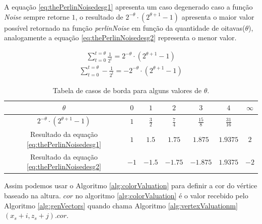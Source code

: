 A equação \ref{eq:thePerlinNoisedesg1} apresenta um caso degenerado caso a função
\textit{Noise} sempre retorne $1$, o resultado de $2^{-\theta} \cdot (2^{\theta +1}-1)$
apresenta o maior valor possível retornado na função \textit{perlinNoise} em função da quantidade 
de oitavas($\theta$), analogamente a equação \ref{eq:thePerlinNoisedesg2} representa o menor valor.
 
\begin{equation}\label{eq:thePerlinNoisedesg1}
  \begin{split}
    \sum_{t=0}^{t=\theta} \frac{1}{2^{t}} = 2^{-\theta} \cdot (2^{\theta +1}-1)
  \end{split}
\end{equation}
\begin{equation}\label{eq:thePerlinNoisedesg2}
  \begin{split}
    \sum_{t=0}^{t=\theta} -\frac{1}{2^{t}} = -2^{-\theta} \cdot (2^{\theta +1}-1)
  \end{split}
\end{equation}

\begin{table}[H]
    \centering
    \caption{Tabela de casos de borda para alguns valores de $\theta$.}
    \label{tab:degenerateNoise}
    \begin{tabular}{| c | c c c c c c|}
        \hline
        $\theta$ & $0$ & $1$ & $2$ & $3$ & $4$ & $\infty$\\
        \hline
        $2^{-\theta} \cdot (2^{\theta +1}-1)$           & $1$  & $\frac{3}{2}$ & $\frac{7}{4}$ & $\frac{15}{8}$    & $\frac{31}{16}$ &   \\
        Resultado da equação \ref{eq:thePerlinNoisedesg1} & $1$  & $1.5$   & $1.75$  & $1.875$ & $1.9375$  & $2$  \\
        Resultado da equação \ref{eq:thePerlinNoisedesg2} & $-1$ & $-1.5$  & $-1.75$ & $-1.875$ & $1.9375$ & $-2$  \\
        \hline
    \end{tabular}
\end{table}

Assim podemos
usar o Algoritmo \ref{alg:colorValuation} para definir a cor do vértice baseado na altura.
$cor$ no algoritmo \ref{alg:colorValuation} é o valor recebido pelo Algoritmo \ref{alg:genVectors}
quando chama Algoritmo \ref{alg:vertexValuationm}$(x_{s} + i, z_{s} + j).cor$.

